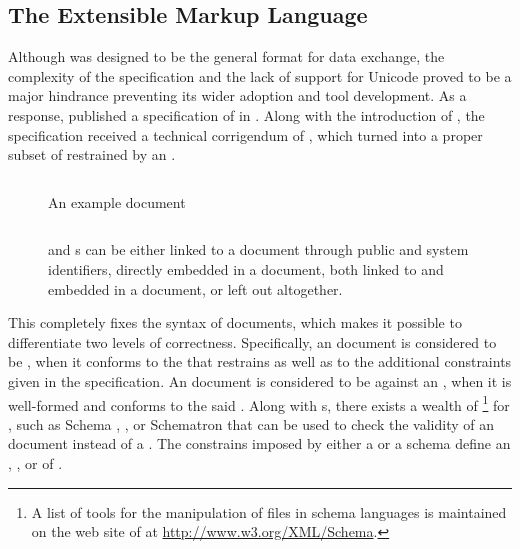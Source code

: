 \documentclass{book}
\begin{document}
\subsection{The Extensible Markup Language}
Although  was designed to be the general format for data exchange,
the complexity of the specification and the lack of support for Unicode proved
to be a major hindrance preventing its wider adoption and tool development. As a
response,  published a specification of  in
\cite{bray98}. Along with the introduction of , the
 specification received a technical corrigendum of
\cite{goldfarb97:webSGML}, which turned  into a proper subset of
 restrained by an  .

\begin{figure}
  \inputminted{xml}{examples/02/recipe.xml}
  \caption{An example  document}
  \label{fig:recipe}\bigskip
  \inputminted{dtd}{examples/02/dtdtypes}
  \caption{ and  s can be either linked
    to a document through public and system identifiers, directly embedded in
    a document, both linked to and embedded in a document, or left out
    altogether.}
  \label{fig:recipe-dtd}
\end{figure}
        
This  completely fixes the syntax of  documents, which
makes it possible to differentiate two levels of correctness. Specifically, an
 document is considered to be %
, when it conforms to the 
 that restrains  as well as to the additional
constraints given in the specification. An  document is
considered to be   against an
 , when it is well-formed and conforms to the said
 .  Along with s, there exists a wealth
of \footnote{
  A list of tools for the manipulation of files in  schema
  languages is maintained on the web site of  at
  \url{http://www.w3.org/XML/Schema}.
} for , such as   Schema
, , or Schematron that can be used to
check the validity of an  document instead of a .
The constrains imposed by either a  or a schema define an
, , or 
 
 of .
\end{document}
